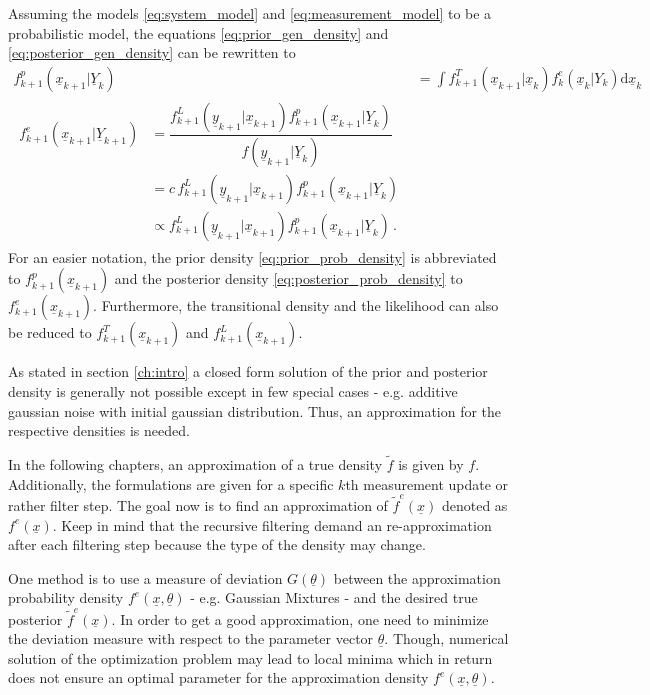 \documentclass[a4paper]{IEEEtran}
\begin{document}
Assuming the models \eqref{eq:system_model} and \eqref{eq:measurement_model} to be a probabilistic model, the equations \eqref{eq:prior_gen_density} and \eqref{eq:posterior_gen_density}
can be rewritten to
\begin{align}
    f^{p}_{k+1}(\underline{x}_{k+1} \vert  \underline{Y}_{k}) &= \int f^{T}_{k+1}(\underline{x}_{k+1} \vert \underline{x}_{k})f^{e}_{k}(\underline{x}_{k} \vert Y_{k})\mathrm{d}\underline{x}_{k} \label{eq:prior_prob_density} \\
    \begin{split}
        f^e_{k+1}(\underline{x}_{k+1} \vert \underline{Y}_{k+1})  &=  \dfrac{f^{L}_{k+1}(\underline{y}_{k+1} \vert \underline{x}_{k+1}) f^{p}_{k+1}(\underline{x}_{k+1} \vert \underline{Y}_{k})}{f(\underline{y}_{k+1} \vert \underline{Y}_{k})} \\
        &= c \, f^{L}_{k+1}(\underline{y}_{k+1} \vert \underline{x}_{k+1}) f^{p}_{k+1}(\underline{x}_{k+1} \vert \underline{Y}_{k}) \\
        &\propto  f^{L}_{k+1}(\underline{y}_{k+1} \vert \underline{x}_{k+1}) f^{p}_{k+1}(\underline{x}_{k+1} \vert \underline{Y}_{k})    \,. \label{eq:posterior_prob_density}
    \end{split}
\end{align}    
For an easier notation, the prior density \eqref{eq:prior_prob_density} is abbreviated to $f^{p}_{k+1}(\underline{x}_{k+1})$ and the posterior density \eqref{eq:posterior_prob_density} to $f^e_{k+1}(\underline{x}_{k+1})$. 
Furthermore, the transitional density and the likelihood can also be reduced to $f^{T}_{k+1}(\underline{x}_{k+1})$ and $f^{L}_{k+1}(\underline{x}_{k+1})$.

As stated in section \ref{ch:intro} a closed form solution of the prior and posterior density is generally not possible except in few special cases - e.g. additive gaussian noise with initial gaussian distribution. Thus, an approximation for the 
respective densities is needed. 

In the following chapters, an approximation of a true density $\tilde{f}$ is given by $f$. Additionally, the formulations are given for a specific $k$th measurement update or rather filter step. The goal now is to find an approximation of $\tilde{f}^e(\underline{x})$ 
denoted as $f^e(\underline{x})$. Keep in mind that the recursive filtering demand an re-approximation after each filtering step because the type of the density may change. 

One method is to use a measure of deviation $G(\underline{\theta})$ between the approximation probability density 
$f^e(\underline{x}, \underline{\theta})$ - e.g. Gaussian Mixtures - and the desired true posterior $\tilde{f}^{e}(\underline{x})$. In order to get a good approximation, one need to minimize the deviation measure with respect to the 
parameter vector $\underline{\theta}$. Though, numerical solution of the optimization problem may lead to local minima which in return does not ensure an optimal parameter for the 
approximation density $f^e(\underline{x}, \underline{\theta})$. 
\end{document}
